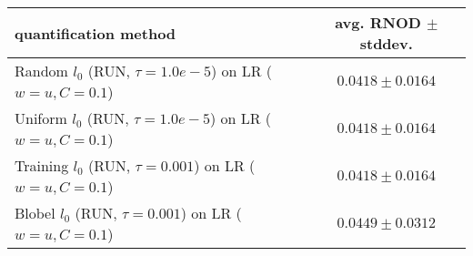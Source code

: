 \begin{tabular}{lc}
  \toprule
  quantification method & avg. RNOD $\pm$ stddev. \\
  \midrule
  Random $l_0$ (RUN, $\tau=1.0e-5$) on LR ($w=u, C=0.1$) & $\mathbf{0.0418 \pm 0.0164}$ \\
  Uniform $l_0$ (RUN, $\tau=1.0e-5$) on LR ($w=u, C=0.1$) & $\mathbf{0.0418 \pm 0.0164}$ \\
  Training $l_0$ (RUN, $\tau=0.001$) on LR ($w=u, C=0.1$) & $0.0418 \pm 0.0164$ \\
  Blobel $l_0$ (RUN, $\tau=0.001$) on LR ($w=u, C=0.1$) & $0.0449 \pm 0.0312$ \\
  \bottomrule
\end{tabular}
